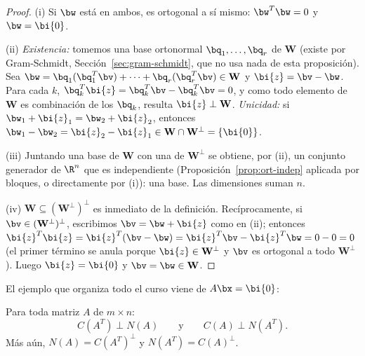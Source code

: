 \begin{proof}
(i) Si $\bw$ está en ambos, es ortogonal a sí mismo: $\bw^T\bw=0$ y
$\bw=\bi{0}$.

(ii) \emph{Existencia:} tomemos una base ortonormal $\bq_1,\dots,\bq_r$ de
$\mathbf{W}$ (existe por Gram-Schmidt, Sección~\ref{sec:gram-schmidt}, que
no usa nada de esta proposición). Sea
$\bw=\bq_1(\bq_1^T\bv)+\cdots+\bq_r(\bq_r^T\bv)\in\mathbf{W}$ y
$\bi{z}=\bv-\bw$. Para cada $k$,
$\bq_k^T\bi{z}=\bq_k^T\bv-\bq_k^T\bv=0$, y como todo
elemento de $\mathbf{W}$ es combinación de los $\bq_k$, resulta
$\bi{z}\perp\mathbf{W}$. \emph{Unicidad:} si
$\bw_1+\bi{z}_1=\bw_2+\bi{z}_2$, entonces
$\bw_1-\bw_2=\bi{z}_2-\bi{z}_1\in\mathbf{W}\cap\mathbf{W}^{\perp}
=\{\bi{0}\}$.

(iii) Juntando una base de $\mathbf{W}$ con una de $\mathbf{W}^{\perp}$ se
obtiene, por (ii), un conjunto generador de $\R^n$ que es independiente
(Proposición~\ref{prop:ort-indep} aplicada por bloques, o directamente por
(i)): una base. Las dimensiones suman $n$.

(iv) $\mathbf{W}\subseteq(\mathbf{W}^{\perp})^{\perp}$ es inmediato de la
definición. Recíprocamente, si $\bv\in(\mathbf{W}^{\perp})^{\perp}$,
escribimos $\bv=\bw+\bi{z}$ como en (ii); entonces
$\bi{z}^T\bi{z}=\bi{z}^T(\bv-\bw)
=\bi{z}^T\bv-\bi{z}^T\bw=0-0=0$
(el primer término se anula porque $\bi{z}\in\mathbf{W}^{\perp}$ y $\bv$ es
ortogonal a todo $\mathbf{W}^{\perp}$). Luego $\bi{z}=\bi{0}$ y
$\bv=\bw\in\mathbf{W}$.
\end{proof}

El ejemplo que organiza todo el curso viene de $A\bx=\bi{0}$:

\begin{teorema}\label{teo:fila-nulo}
Para toda matriz $A$ de $m\times n$:
\[
C(A^T)\perp N(A)
\qquad\text{y}\qquad
C(A)\perp N(A^T).
\]
Más aún, $N(A)=C(A^T)^{\perp}$ y $N(A^T)=C(A)^{\perp}$.
\end{teorema}

